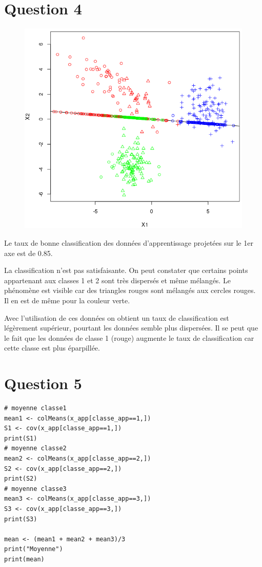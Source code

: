 \documentclass[a4paper,12pt]{report}
\begin{document}
\section*{Question 4}


\begin{figure}[!ht]
	\center
	\includegraphics[scale=0.4]{image/q4.png}
\end{figure}

Le taux de bonne classification des données d’apprentissage projetées sur le 1er axe est de 0.85.

La classification n'est pas satisfaisante. On peut constater que certains points appartenant aux classes 1 et 2 sont très dispersés et même mélangés. Le phénomène est visible car des triangles rouges sont mélangés aux cercles rouges. Il en est de même pour la couleur verte.

Avec l'utilisation de ces données on obtient un taux de classification est légèrement supérieur, pourtant les données semble plus dispersées. Il se peut que le fait que les données de classe 1 (rouge) augmente le taux de classification car cette classe est plus éparpillée. 

\newpage

\section*{Question 5}

\begin{lstlisting}
# moyenne classe1
mean1 <- colMeans(x_app[classe_app==1,])
S1 <- cov(x_app[classe_app==1,])
print(S1)
# moyenne classe2
mean2 <- colMeans(x_app[classe_app==2,])
S2 <- cov(x_app[classe_app==2,])
print(S2)
# moyenne classe3
mean3 <- colMeans(x_app[classe_app==3,])
S3 <- cov(x_app[classe_app==3,])
print(S3)

mean <- (mean1 + mean2 + mean3)/3
print("Moyenne")
print(mean)
\end{lstlisting}
\end{document}
